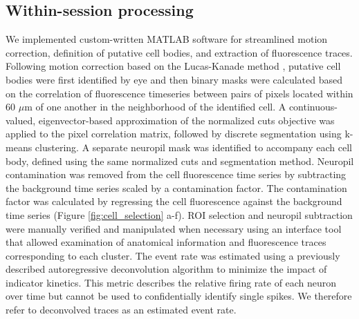 \subsection{Within-session processing}
We implemented custom-written MATLAB software for streamlined motion correction, definition of putative cell bodies, and extraction of fluorescence traces. Following motion correction based on the Lucas-Kanade method \citep{Greenberg2009}, putative cell bodies were first identified by eye and then binary masks were calculated based on the correlation of fluorescence timeseries between pairs of pixels located within 60 $\mu$m of one another in the neighborhood of the identified cell. A continuous-valued, eigenvector-based approximation of the normalized cuts objective \citep{Shi2000} was applied to the pixel correlation matrix, followed by discrete segmentation using k-means clustering. A separate neuropil mask was identified to accompany each cell body, defined using the same normalized cuts and segmentation method. Neuropil contamination was removed from the cell fluorescence time series by subtracting the background time series scaled by a contamination factor. The contamination factor was calculated by regressing the cell fluorescence against the background time series (Figure \ref{fig:cell_selection} a-f). ROI selection and neuropil subtraction were manually verified and manipulated when necessary using an interface tool that allowed examination of anatomical information and fluorescence traces corresponding to each cluster. The event rate was estimated using a previously described autoregressive deconvolution algorithm \citep{pnevmatikakis2016simultaneous} to minimize the impact of indicator kinetics. This metric describes the relative firing rate of each neuron over time but cannot be used to confidentially identify single spikes. We therefore refer to deconvolved traces as an estimated event rate.

